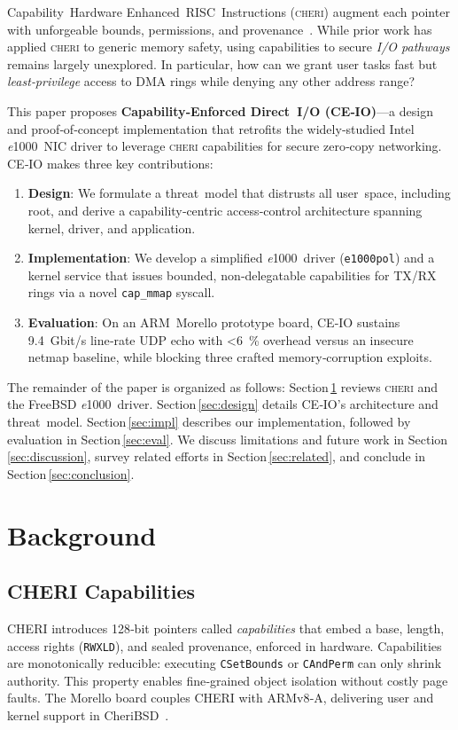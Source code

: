 \documentclass[sigconf]{acmart}
\newcommand{\cheri}{\textsc{cheri}\xspace}
\newcommand{\e}{\textit{e}1000\xspace}
\begin{document}
Capability Hardware Enhanced RISC Instructions (\cheri) augment each pointer with unforgeable bounds, permissions, and provenance \cite{woodruff2019cheri}. While prior work has applied \cheri to generic memory safety, using capabilities to secure \emph{I/O pathways} remains largely unexplored. In particular, how can we grant user tasks fast but \textit{least‑privilege} access to DMA rings while denying any other address range?  

This paper proposes \textbf{Capability‑Enforced Direct I/O (CE‑IO)}—a design and proof‑of‑concept implementation that retrofits the widely‑studied Intel \e NIC driver to leverage \cheri capabilities for secure zero‑copy networking. CE‑IO makes three key contributions:  
\begin{enumerate}
    \item \textbf{Design}: We formulate a threat model that distrusts all user space, including root, and derive a capability‑centric access‑control architecture spanning kernel, driver, and application.  
    \item \textbf{Implementation}: We develop a simplified \e driver (\texttt{e1000pol}) and a kernel service that issues bounded, non‑delegatable capabilities for TX/RX rings via a novel \texttt{cap\_mmap} syscall.  
    \item \textbf{Evaluation}: On an ARM Morello prototype board, CE‑IO sustains 9.4 Gbit/s line‑rate UDP echo with \textless6 \% overhead versus an insecure netmap baseline, while blocking three crafted memory‑corruption exploits.  
\end{enumerate}

\noindent The remainder of the paper is organized as follows: Section\,\ref{sec:background} reviews \cheri and the FreeBSD \e driver. Section\,\ref{sec:design} details CE‑IO’s architecture and threat model. Section\,\ref{sec:impl} describes our implementation, followed by evaluation in Section\,\ref{sec:eval}. We discuss limitations and future work in Section\,\ref{sec:discussion}, survey related efforts in Section\,\ref{sec:related}, and conclude in Section\,\ref{sec:conclusion}.

\section{Background}
\label{sec:background}
\subsection{CHERI Capabilities}
CHERI introduces 128‑bit pointers called \emph{capabilities} that embed a base, length, access rights (\texttt{RWXLD}), and sealed provenance, enforced in hardware. Capabilities are monotonically reducible: executing \texttt{CSetBounds} or \texttt{CAndPerm} can only shrink authority. This property enables fine‑grained object isolation without costly page faults. The Morello board couples CHERI with ARMv8‑A, delivering user and kernel support in CheriBSD \cite{cheribsd}.  
\end{document}
